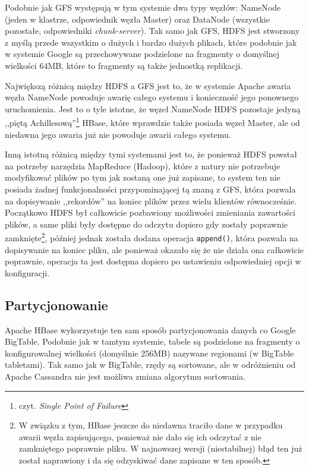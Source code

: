 Podobnie jak GFS występują w tym systemie dwa typy węzłów: NameNode (jeden w klastrze, odpowiednik węzła Master) oraz DataNode (wszystkie pozostałe, odpowiedniki \emph{chunk-server}).
Tak samo jak GFS, HDFS jest stworzony z myślą przede wszystkim o dużych i bardzo dużych plikach, które podobnie jak w systemie Google są przechowywane podzielone na fragmenty o domyślnej wielkości 64MB, które to fragmenty są także jednostką replikacji.

Największą różnicą między HDFS a GFS jest to, że w systemie Apache awaria węzła NameNode powoduje awarię całego systemu i konieczność jego ponownego uruchomienia.
Jest to o tyle istotne, że węzeł NameNode HDFS pozostaje jedyną ,,piętą Achillesową''\footnote{czyt. \emph{Single Point of Failure}} HBase, które wprawdzie także posiada węzeł Master, ale od niedawna jego awaria już nie powoduje awarii całego systemu.

Inną istotną różnicą między tymi systemami jest to, że ponieważ HDFS powstał na potrzeby narzędzia MapReduce (Hadoop), które z natury nie potrzebuje modyfikować plików po tym jak zostaną one już zapisane, to system ten nie posiada żadnej funkcjonalności przypominającej tą znaną z GFS, która pozwala na dopisywanie ,,rekordów'' na koniec plików przez wielu klientów równocześnie.
Początkowo HDFS był całkowicie pozbawiony możliwości zmieniania zawartości plików, a same pliki były dostępne do odczytu dopiero gdy zostały poprawnie zamknięte\footnote{W związku z tym, HBase jeszcze do niedawna traciło dane w przypadku awarii węzła zapisującego, ponieważ nie dało się ich odczytać z nie zamkniętego poprawnie pliku. W najnowszej wersji (niestabilnej) błąd ten już został naprawiony i da się odzyskiwać dane zapisane w ten sposób.}, później jednak została dodana operacja \verb+append()+, która pozwala na dopisywanie na koniec pliku, ale ponieważ okazało się że nie działa ona całkowicie poprawnie, operacja ta jest dostępna dopiero po ustawieniu odpowiedniej opcji w konfiguracji.

\subsection*{Partycjonowanie}

Apache HBase wykorzystuje ten sam sposób partycjonowania danych co Google BigTable.
Podobnie jak w tamtym systemie, tabele są podzielone na fragmenty o konfigurowalnej wielkości (domyślnie 256MB) nazywane regionami (w BigTable tabletami).
Tak samo jak w BigTable, rzędy są sortowane, ale w odróżnieniu od Apache Cassandra nie jest możliwa zmiana algorytmu sortowania.

